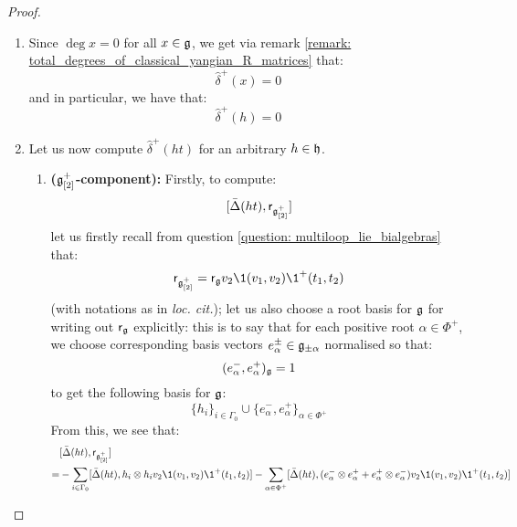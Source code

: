             \begin{proof}
                \begin{enumerate}
                    \item Since $\deg x = 0$ for all $x \in \mathfrak{g}$, we get via remark \ref{remark: total_degrees_of_classical_yangian_R_matrices} that:
                        $$\hat{\delta}^+(x) = 0$$
                    and in particular, we have that:
                        $$\hat{\delta}^+(h) = 0$$

                    \item Let us now compute $\hat{\delta}^+(ht)$ for an arbitrary $h \in \mathfrak{h}$. 
                    \begin{enumerate}
                        \item \textbf{($\mathfrak{g}_{[2]}^+$-component):} Firstly, to compute:
                            $$[\bar{\Delta}(ht), \mathsf{r}_{\mathfrak{g}_{[2]}^+}]$$
                        let us firstly recall from question \ref{question: multiloop_lie_bialgebras} that:
                            $$\sfr_{\g_{[2]}^+} = \sfr_{\g} v_2\1(v_1, v_2) \1^+(t_1, t_2)$$
                        (with notations as in \textit{loc. cit.}); let us also choose a root basis for $\mathfrak{g}$ for writing out $\mathsf{r}_{\mathfrak{g}}$ explicitly: this is to say that for each positive root $\alpha \in \Phi^+$, we choose corresponding basis vectors $e_{\alpha}^{\pm} \in \mathfrak{g}_{\pm \alpha}$ normalised so that:
                            $$(e_{\alpha}^-, e_{\alpha}^+)_{\mathfrak{g}} = 1$$
                        to get the following basis for $\mathfrak{g}$:
                            $$\{h_i\}_{i \in \Gamma_0} \cup \{e_{\alpha}^-, e_{\alpha}^+\}_{\alpha \in \Phi^+}$$
                        From this, we see that:
                            $$
                                \begin{aligned}
                                    & [\bar{\Delta}(ht), \sfr_{\g_{[2]}^+}]
                                    \\
                                    = & -\sum_{i \in \Gamma_0} [\bar{\Delta}(ht), h_i \tensor h_i v_2\1(v_1, v_2) \1^+(t_1, t_2)] - \sum_{\alpha \in \Phi^+} [\bar{\Delta}(ht), (e_{\alpha}^- \tensor e_{\alpha}^+ + e_{\alpha}^+ \tensor e_{\alpha}^-) v_2\1(v_1, v_2) \1^+(t_1, t_2)]
                                \end{aligned}
                            $$


\end{enumerate}
\end{enumerate}
\end{proof}
